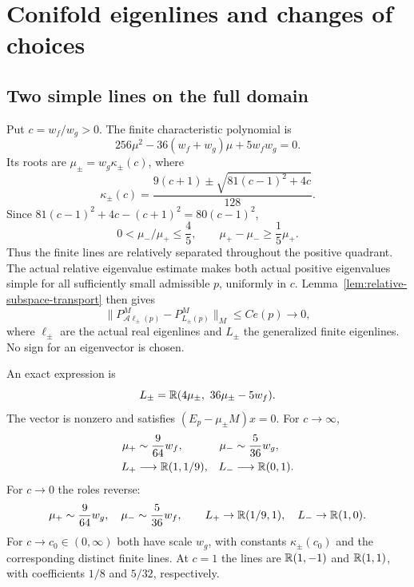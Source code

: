 \section{Conifold eigenlines and changes of choices}
\label{sec:eigenlines-choices}

\subsection{Two simple lines on the full domain}

Put $c=w_f/w_g>0$. The finite characteristic
polynomial is
\begin{equation}\label{eq:conifold-characteristic}
 256\mu^2-36(w_f+w_g)\mu+5w_fw_g=0.
\end{equation}
Its roots are $\mu_\pm=w_g\kappa_\pm(c)$, where
\begin{equation}\label{eq:conifold-ratio-roots}
 \kappa_\pm(c)=
 \frac{9(c+1)\pm\sqrt{81(c-1)^2+4c}}{128}.
\end{equation}
Since
$81(c-1)^2+4c-(c+1)^2=80(c-1)^2$,
\begin{equation}\label{eq:uniform-conifold-gap}
 0<\mu_-/\mu_+\le\frac45,\qquad
             \mu_+-\mu_-\ge\frac15\mu_+.
\end{equation}
Thus the finite lines are relatively separated
throughout the positive quadrant. The actual
relative eigenvalue estimate makes both actual
positive eigenvalues simple for all sufficiently
small admissible $p$, uniformly in $c$.
Lemma~\ref{lem:relative-subspace-transport}
then gives
\begin{equation}\label{eq:conifold-line-transport}
 \|P^M_{\mathcal A\ell_\pm(p)}
                 -P^M_{L_\pm(p)}\|_M\le Ce(p)\to0,
\end{equation}
where $\ell_\pm$ are the actual real eigenlines
and $L_\pm$ the generalized finite eigenlines.
No sign for an eigenvector is chosen.

An exact expression is
\begin{equation}\label{eq:conifold-line-formula}
 L_\pm=\mathbb R(4\mu_\pm,\ 36\mu_\pm-5w_f).
\end{equation}
The vector is nonzero and satisfies
$(E_p-\mu_\pm M)x=0$. For $c\to\infty$,
\begin{equation}\label{eq:conifold-large-ratio}
 \begin{aligned}
 \mu_+&\sim\frac9{64}w_f,&
 \mu_-&\sim\frac5{36}w_g,\\
 L_+&\longrightarrow\mathbb R(1,1/9),&
 L_-&\longrightarrow\mathbb R(0,1).
 \end{aligned}
\end{equation}
For $c\to0$ the roles reverse:
\[
 \mu_+\sim\frac9{64}w_g,\quad
 \mu_-\sim\frac5{36}w_f,\qquad
 L_+\to\mathbb R(1/9,1),\quad L_-\to\mathbb R(1,0).
\]
For $c\to c_0\in(0,\infty)$ both have scale
$w_g$, with constants $\kappa_\pm(c_0)$
and the corresponding distinct finite lines.
At $c=1$ the lines are $\mathbb R(1,-1)$ and
$\mathbb R(1,1)$, with coefficients $1/8$ and
$5/32$, respectively.

